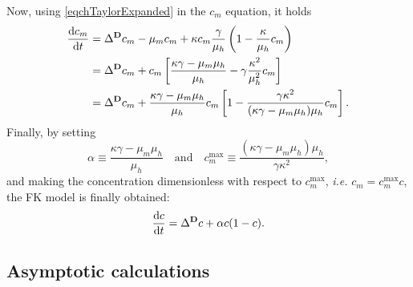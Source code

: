                 Now, using \eqref{eqchTaylorExpanded} in the $c_m$ equation, it holds
                \begin{align}
                    \frac{\mathrm{d}c_m}{\mathrm{d}t}&=\Delta^{\mathbf D} c_m-\mu_mc_m
                    +\kappa c_m\frac\gamma{\mu_h}
                    \left(1-\frac\kappa{\mu_h}c_m\right)
                    \nonumber\\
                    &=\Delta^{\mathbf D} c_m+c_m\left[
                    \frac{\kappa\gamma-\mu_m\mu_h}{\mu_h}
                    -\gamma\frac{\kappa^2}{\mu^2_h}c_m\right]
                    \label{eqcmReformulated}\\
                    &=\Delta^{\mathbf D} c_m+
                    \frac{\kappa\gamma-\mu_m\mu_h}{\mu_h}c_m\left[
                    1-\frac{\gamma\kappa^2}
                    {(\kappa\gamma-\mu_m\mu_h)\mu_h}c_m\right].
                    \nonumber
                \end{align}
                Finally, by setting
                \begin{equation}
                    \alpha\equiv\frac{\kappa\gamma-\mu_m\mu_h}{\mu_h}
                    \quad\text{and}\quad
                    c_m^{\max}\equiv\frac{(\kappa\gamma-\mu_m\mu_h)\mu_h}
                    {\gamma\kappa^2},
                    \label{eqFKFromHDParameters}
                \end{equation}
                and making the concentration dimensionless with respect to $c^{\max}_m$, \textit{i.e.} $c_m=c_m^{\max}c$, the FK model is finally obtained:
                \begin{equation}
                    \frac{\mathrm{d}c}{\mathrm{d}t}=\Delta^{\mathbf D} c+\alpha c(1-c).
                    \label{eqFKFromHD}
                \end{equation}

            \subsection{Asymptotic \texorpdfstring{\HDcontinuous{}}{[HD]\_c} calculations}\label{apxAsymptoticHDCalcs}

